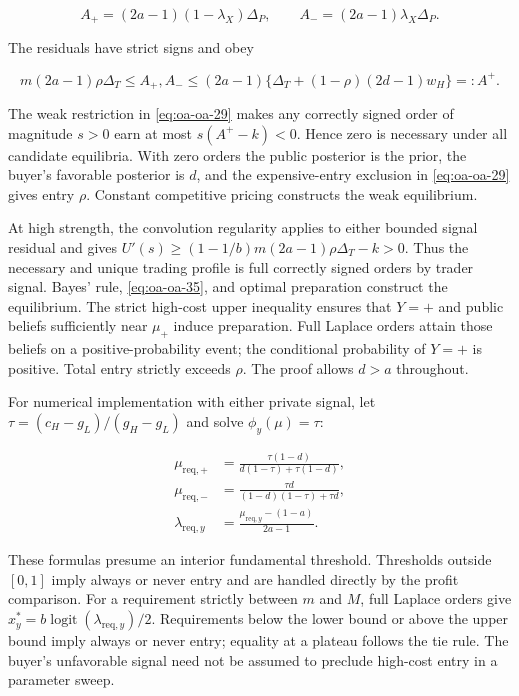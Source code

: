 \documentclass[
  11pt,
]{article}
\begin{document}
\[
A_+=(2a-1)(1-\lambda_X)\Delta_P,\qquad
A_-=(2a-1)\lambda_X\Delta_P.
\tag{OA.37}\label{eq:oa-oa-37}
\]

The residuals have strict signs and obey

\[
m(2a-1)\rho\Delta_T\le A_+,A_-
\le(2a-1)\{\Delta_T+(1-\rho)(2d-1)w_H\}=: A^+.
\tag{OA.38}\label{eq:oa-oa-38}
\]

The weak restriction in \eqref{eq:oa-oa-29} makes any correctly signed
order of magnitude \(s>0\) earn at most \(s(A^+-k)<0\). Hence
zero is necessary under all candidate equilibria. With zero orders the
public posterior is the prior, the buyer's favorable posterior is \(d\),
and the expensive-entry exclusion in \eqref{eq:oa-oa-29} gives entry
\(\rho\). Constant competitive pricing constructs the weak equilibrium.

At high strength, the convolution regularity applies to either bounded
signal residual and gives \(U'(s)\ge(1-1/b)m(2a-1)\rho\Delta_T-k>0\).
Thus the necessary and unique trading profile is full correctly signed
orders by trader signal. Bayes' rule, \eqref{eq:oa-oa-35}, and optimal
preparation construct the equilibrium. The strict high-cost upper
inequality ensures that \(Y=+\) and public beliefs sufficiently near
\(\mu_+\) induce preparation. Full Laplace orders attain those beliefs
on a positive-probability event; the conditional probability of \(Y=+\)
is positive. Total entry strictly exceeds \(\rho\). The proof allows
\(d>a\) throughout.

For numerical implementation with either private signal, let
\(\tau=(c_H-g_L)/(g_H-g_L)\) and solve \(\phi_y(\mu)=\tau\):

\[
\begin{aligned}
\mu_{\mathrm{req},+}&=\frac{\tau(1-d)}{d(1-\tau)+\tau(1-d)},\\
\mu_{\mathrm{req},-}&=\frac{\tau d}{(1-d)(1-\tau)+\tau d},\\
\lambda_{\mathrm{req},y}&=\frac{\mu_{\mathrm{req},y}-(1-a)}{2a-1}.
\end{aligned}
\tag{OA.39}\label{eq:oa-oa-39}
\]

These formulas presume an interior fundamental threshold. Thresholds
outside \([0,1]\) imply always or never entry and are handled directly
by the profit comparison. For a requirement strictly between \(m\) and
\(M\), full Laplace orders give
\(x_y^*=b\operatorname{logit}(\lambda_{\mathrm{req},y})/2\).
Requirements below the lower bound or above the upper bound imply always
or never entry; equality at a plateau follows the tie rule. The buyer's
unfavorable signal need not be assumed to preclude high-cost entry in a
parameter sweep.
\end{document}
